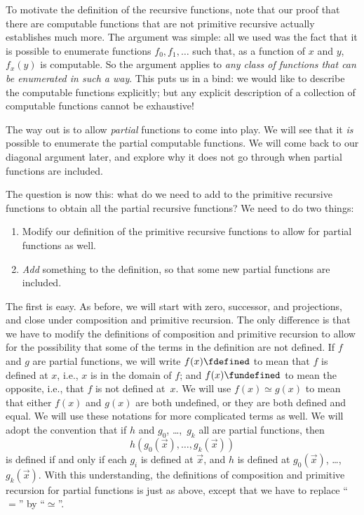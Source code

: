 \documentclass[../../../include/open-logic-section]{subfiles}
\begin{document}


To motivate the definition of the recursive functions, note that our
proof that there are computable functions that are not primitive
recursive actually establishes much more. The argument was
simple: all we used was the fact that it is possible to enumerate
functions $f_0,f_1,\dots$ such that, as a function of $x$ and $y$,
$f_x(y)$ is computable. So the argument applies to \emph{any class of
  functions that can be enumerated in such a way}. This puts us in a
bind: we would like to describe the computable functions explicitly;
but any explicit description of a collection of computable functions
cannot be exhaustive!

The way out is to allow \emph{partial} functions to come into play. We
will see that it \emph{is} possible to enumerate the partial
computable functions. We will come back to our diagonal
argument later, and explore why it does not go through when partial
functions are included.

The question is now this: what do we need to add to the primitive
recursive functions to obtain all the partial recursive functions? We
need to do two things:
\begin{enumerate}
\item Modify our definition of the primitive recursive functions to
  allow for partial functions as well.
\item \emph{Add} something to the definition, so that some new partial
  functions are included.
\end{enumerate}

The first is easy. As before, we will start with zero, successor, and
projections, and close under composition and primitive recursion. The
only difference is that we have to modify the definitions of
composition and primitive recursion to allow for the possibility that
some of the terms in the definition are not defined. If $f$ and $g$
are partial functions, we will write $f(x) \fdefined$ to mean that $f$
is defined at $x$, i.e., $x$ is in the domain of $f$; and $f(x)
\fundefined$ to mean the opposite, i.e., that $f$ is not defined at~$x$.
We will use $f(x) \simeq g(x)$ to mean that either $f(x)$ and $g(x)$
are both undefined, or they are both defined and equal. We will use these
notations for more complicated terms as well. We will adopt the
convention that if $h$ and $g_0$, \dots,~$g_k$ all are partial functions,
then
\[
h(g_0(\vec x),\dots,g_k(\vec x))
\]
is defined if and only if each $g_i$ is defined at $\vec x$, and $h$
is defined at $g_0(\vec x)$, \dots,~$g_k(\vec x)$. With this
understanding, the definitions of composition and primitive recursion
for partial functions is just as above, except that we have to replace
``$=$'' by ``$\simeq$''.
\end{document}
